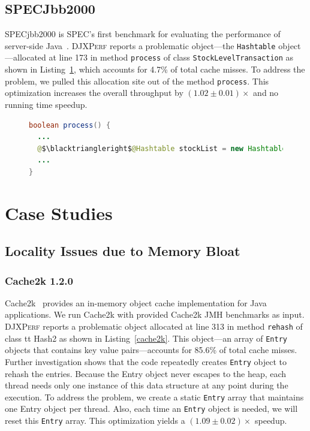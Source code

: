 \documentclass[sigconf,10pt,review,anonymous]{acmart}\settopmatter{printfolios=true,printccs=false,printacmref=false}
\newcommand{\tool}[0]{\mbox{\textsc{DJXPerf}}}
\begin{document}
\subsection{SPECJbb2000}
SPECjbb2000 is SPEC's first benchmark for evaluating the performance of server-side Java~\cite{specjbb2000}. \tool{} reports a problematic object---the {\tt Hashtable} object---allocated at line 173 in method {\tt process} of class {\tt StockLevelTransaction} as shown in Listing~\ref{specjbbb2000}, which accounts for 4.7\% of total cache misses. To address the problem, we pulled this allocation site out of the method {\tt process}. This optimization increases the overall throughput by $(1.02\pm0.01)\times$ and no running time speedup.

\begin{figure}
\begin{lstlisting}[firstnumber=171,language=java]
boolean process() {
  ...
  @$\blacktriangleright$@Hashtable stockList = new Hashtable(200);
  ...
}
\end{lstlisting}
\vspace{-0.3in}
\label{specjbbb2000}
\end{figure}


\section{Case Studies}
\subsection{Locality Issues due to Memory Bloat}
\subsubsection{Cache2k 1.2.0}
Cache2k~\cite{cache2k} provides an in-memory object cache implementation for Java applications. 
We run Cache2k with provided Cache2k JMH benchmarks as input.
\tool{} reports a problematic object allocated at line 313 in method {\tt rehash} of class {tt Hash2} as shown in Listing~\ref{cache2k}. This object---an array of {\tt Entry} objects that contains key value pairs---accounts for 85.6\% of  total cache misses. 
Further investigation shows that the code repeatedly creates {\tt Entry} object to rehash the entries. Because the Entry object never escapes to the heap, each thread needs only one instance of this data structure at any point during the execution. To address the problem, we create a static {\tt Entry} array that maintains one Entry object per thread. Also, each time an {\tt Entry} object is needed, we will reset this {\tt Entry} array. This optimization yields a $(1.09\pm0.02)\times$ speedup. 
\end{document}

